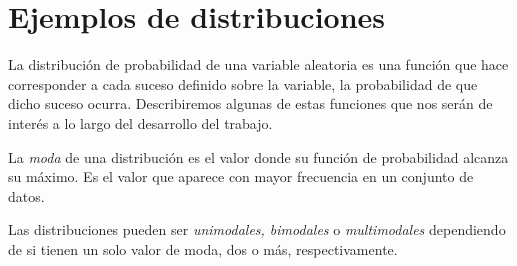 \documentclass[oneside,openright,titlepage,numbers=noenddot,openany,headinclude,footinclude=true,
cleardoublepage=empty,abstractoff,BCOR=5mm,paper=a4,fontsize=12pt,main=spanish]{scrreprt}
\begin{document}
\section{Ejemplos de distribuciones}

La distribución de probabilidad de una variable aleatoria es una función que hace corresponder a cada suceso definido sobre la variable, la probabilidad de que dicho suceso ocurra. Describiremos algunas de estas funciones que nos serán de interés a lo largo del desarrollo del trabajo.\\

\begin{definition}[Moda]
La \textit{moda} de una distribución es el valor donde su función de probabilidad alcanza su máximo. Es el valor que aparece con mayor frecuencia en un conjunto de datos.
\end{definition}

\clearpage

Las distribuciones pueden ser \textit{unimodales, bimodales} o \textit{multimodales} dependiendo de si tienen un solo valor de moda, dos o más, respectivamente.\\
\end{document}

